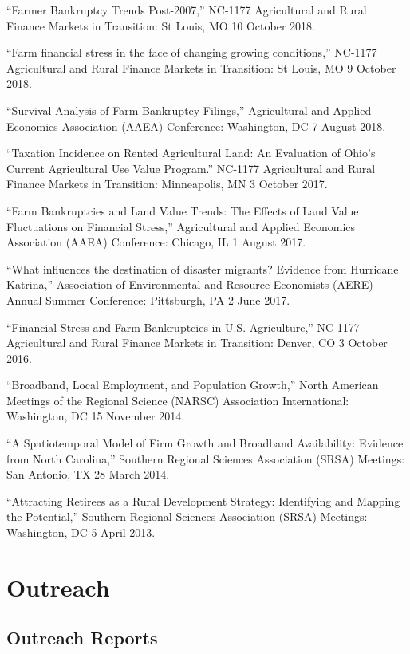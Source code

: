 \documentclass[letterpaper]{article}
\renewenvironment{itemize}{
  \begin{list}{}{
    \setlength{\leftmargin}{1.5em}
  }
}{
  \end{list}
}
\begin{document}
\begin{itemize}
\item ``Farmer Bankruptcy Trends Post-2007,'' NC-1177 Agricultural and Rural Finance Markets in Transition: St Louis, MO 10 October 2018.
\item ``Farm financial stress in the face of changing growing conditions,'' NC-1177 Agricultural and Rural Finance Markets in Transition: St Louis, MO 9 October 2018.
\item ``Survival Analysis of Farm Bankruptcy Filings,'' Agricultural and Applied Economics Association (AAEA) Conference: Washington, DC 7 August 2018.
\item ``Taxation Incidence on Rented Agricultural Land: An Evaluation of Ohio's Current Agricultural Use Value Program.'' NC-1177 Agricultural and Rural Finance Markets in Transition: Minneapolis, MN 3 October 2017.
\item ``Farm Bankruptcies and Land Value Trends: The Effects of Land Value Fluctuations on Financial Stress,'' Agricultural and Applied Economics Association (AAEA) Conference: Chicago, IL 1 August 2017.
\item ``What influences the destination of disaster migrants? Evidence from Hurricane Katrina,'' Association of Environmental and Resource Economists (AERE) Annual Summer Conference: Pittsburgh, PA 2 June 2017.
\item ``Financial Stress and Farm Bankruptcies in U.S. Agriculture,'' NC-1177 Agricultural and Rural Finance Markets in Transition: Denver, CO 3 October 2016.
\item ``Broadband, Local Employment, and Population Growth,'' North American Meetings of the Regional Science (NARSC) Association International: Washington, DC 15 November 2014.
\item ``A Spatiotemporal Model of Firm Growth and Broadband Availability: Evidence from North Carolina,'' Southern Regional Sciences Association (SRSA) Meetings: San Antonio, TX 28 March 2014.
\item ``Attracting Retirees as a Rural Development Strategy: Identifying and Mapping the Potential,'' Southern Regional Sciences Association (SRSA) Meetings: Washington, DC 5 April 2013.
\end{itemize}

\section*{Outreach}

\subsection*{Outreach Reports}
\end{document}
